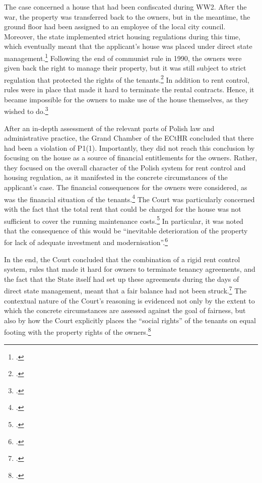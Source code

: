 \documentclass[12pt,a4paper]{book} %
\begin{document}
The case concerned a house that had been confiscated during WW2. After the war, the property was transferred back to the owners, but in the meantime, the ground floor had been assigned to an employee of the local city council. Moreover, the state implemented strict housing regulations during this time, which eventually meant that the applicant's house was placed under direct state management.\footcite[20-31]{hutten06} Following the end of communist rule in 1990, the owners were given back the right to manage their property, but it was still subject to strict regulation that protected the rights of the tenants.\footcite[31-53]{hutten06} In addition to rent control, rules were in place that made it hard to terminate the rental contracts. Hence, it became impossible for the owners to make use of the house themselves, as they wished to do.\footcite[20-53]{hutten06} 

After an in-depth assessment of the relevant parts of Polish law and administrative practice, the Grand Chamber of the ECtHR concluded that there had been a violation of P1(1). Importantly, they did not reach this conclusion by focusing on the house as a source of financial entitlements for the owners. Rather, they focused on the overall character of the Polish system for rent control and housing regulation, as it manifested in the concrete circumstances of the applicant's case. The financial consequences for the owners were considered, as was the financial situation of the tenants.\footcite[60-61]{hutten06} The Court was particularly concerned with the fact that the total rent that could be charged for the house was not sufficient to cover the running maintenance costs.\footcite[224]{hutten06} In particular, it was noted that the consequence of this would be ``inevitable deterioration of the property for lack of adequate investment and modernisation''.\footnote{\cite[224]{hutten06}.}

In the end, the Court concluded that the combination of a rigid rent control system, rules that made it hard for owners to terminate tenancy agreements, and the fact that the State itself had set up these agreements during the days of direct state management, meant that a fair balance had not been struck.\footcite[224-225]{hutten06} The contextual nature of the Court's reasoning is evidenced not only by the extent to which the concrete circumstances are assessed against the goal of fairness, but also by how the Court explicitly places the ``social rights'' of the tenants on equal footing with the property rights of the owners.\footcite[225]{hutten06} 
\end{document}
